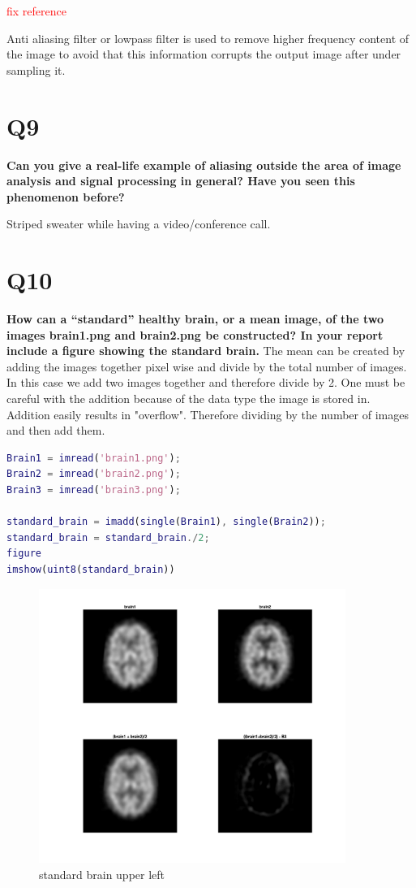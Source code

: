 \documentclass[oneside,a4paper]{article}
\begin{document}
\textcolor{red}{fix reference}

Anti aliasing filter or lowpass filter is used to remove higher frequency content of the image to avoid that this information corrupts the output image after under sampling it. 


\section*{Q9}
\textbf{Can you give a real-life example of aliasing outside the area of image analysis and signal processing in general? Have you seen this phenomenon before?}

Striped sweater while having a video/conference call. 

\section*{Q10}
\textbf{How can a “standard” healthy brain, or a mean image, of the two images brain1.png and brain2.png be constructed? In your report include a figure showing the standard brain.}
The mean can be created by adding the images together pixel wise and divide by the total number of images. In this case we add two images together and therefore divide by 2. One must be careful with the addition because of the data type the image is stored in. Addition easily results in "overflow". Therefore dividing by the number of images and then add them.  


\begin{lstlisting}[language=MATLAB]
Brain1 = imread('brain1.png');
Brain2 = imread('brain2.png');
Brain3 = imread('brain3.png');

standard_brain = imadd(single(Brain1), single(Brain2));
standard_brain = standard_brain./2;
figure
imshow(uint8(standard_brain))
\end{lstlisting}

\begin{figure}[ht!]
\centering
\includegraphics[width=100mm]{figures/Q11.png}
\caption{standard brain upper left}
\label{fig:Q10}
\end{figure}
\end{document}
